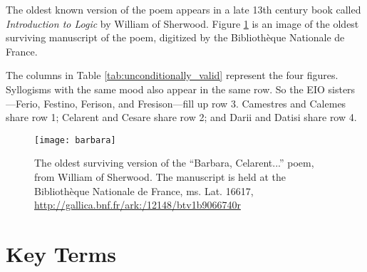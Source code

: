 The oldest known version of the poem appears in a late 13th century book called \textit{Introduction to Logic} by William of Sherwood. Figure \ref{fig:barbara} is an image of the oldest surviving manuscript of the poem, digitized by the Bibliothèque Nationale de France.

The columns in Table \ref{tab:unconditionally_valid} represent the four figures. Syllogisms with the same mood also appear in the same row. So the EIO sisters---Ferio, Festino, Ferison, and Fresison---fill up row 3.  Camestres and Calemes share row 1;  Celarent and Cesare share row 2; and Darii and Datisi share row 4.

\begin{figure}[b]
\texttt{[image: barbara]}

\caption{The oldest surviving version of the ``Barbara, Celarent...'' poem, from William of Sherwood. The manuscript is held at the Biblioth\`eque Nationale de France, ms. Lat. 16617, \url{http://gallica.bnf.fr/ark:/12148/btv1b9066740r}}
\label{fig:barbara}
\end{figure}


\section*{Key Terms}
\begin{sortedlist}

\end{sortedlist}

